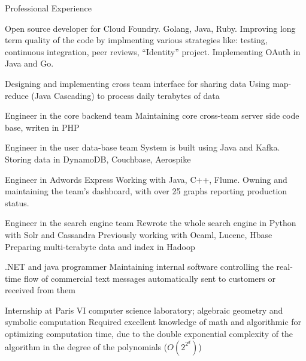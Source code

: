 \begin{rubric}{\color{ForestGreen} Professional Experience}

   Open source developer
  for Cloud Foundry. Golang, Java, Ruby.
  Improving long term quality of the code by implmenting various
  strategies like: testing, continuous integration, peer reviews,
  \entry*``Identity'' project. Implementing OAuth in Java and Go.

   Designing and implementing cross team interface for sharing data
  Using map-reduce (Java Cascading) to process daily terabytes of data

   Engineer in the core backend team
  Maintaining core cross-team server side code base, writen in PHP

   Engineer in the user data-base team
  System is built using Java and Kafka. Storing data in DynamoDB,
  Couchbase, Aerospike

  \entry*[\color{ForestGreen} {Feb 13 - Sep 14}]  Engineer in {Adwords Express}
  Working with Java, C++, Flume. Owning and maintaining the team's
  dashboard, with over 25 graphs reporting production status.


  Engineer in the {search engine team}
  Rewrote the whole search engine in Python with Solr and Cassandra
  Previously working with Ocaml, Lucene, Hbase
  Preparing multi-terabyte data and index in Hadoop


  .NET and java programmer
  Maintaining internal software controlling the real-time flow of
  commercial text messages automatically sent to customers or received
  from them


  Internship at Paris VI computer science laboratory;
  algebraic geometry and symbolic computation
  Required excellent knowledge of math and algorithmic for optimizing
  computation time, due to the double exponential complexity of the
  algorithm in the degree of the polynomials ($O(2^{2^d})$)

\end{rubric}
